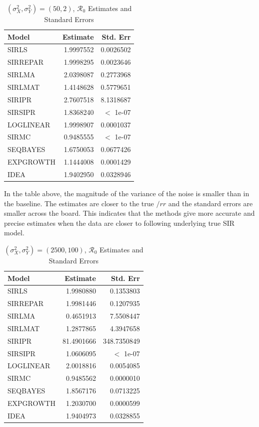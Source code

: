 \documentclass[12pt]{article}
\newcommand{\rr}{\ensuremath{\mathcal{R}_0}}
\begin{document}
\begin{table}[H]
	
	\caption{\label{tab:} $(\sigma^2_X, \sigma^2_Y) = (50, 2)$, $\rr$ Estimates and Standard Errors}
	\centering
	\begin{tabular}[t]{l|r|r}
		\hline
		Model & Estimate & Std. Err\\
		\hline
		SIRLS & 1.9997552 & 0.0026502\\
		\hline
		SIRREPAR & 1.9998295 & 0.0023646\\
		\hline
		SIRLMA & 2.0398087 & 0.2773968\\
		\hline
		SIRLMAT & 1.4148628 & 0.5779651\\
		\hline
		SIRIPR & 2.7607518 & 8.1318687\\
		\hline
		SIRSIPR & 1.8368240 & $<$ 1e-07\\
		\hline
		LOGLINEAR & 1.9998907 & 0.0001037\\
		\hline
		SIRMC & 0.9485555 & $<$ 1e-07\\
		\hline
		SEQBAYES & 1.6750053 & 0.0677426\\
		\hline
		EXPGROWTH & 1.1444008 & 0.0001429\\
		\hline
		IDEA & 1.9402950 & 0.0328946\\
		\hline
	\end{tabular}
\end{table}

In the table above, the magnitude of the variance of the noise is smaller than in the baseline. The estimates are closer to the true $/rr$ and the standard errors are smaller across the board. This indicates that the methods give more accurate and precise estimates when the data are closer to following underlying true SIR model.


\begin{table}[H]
	
	\caption{\label{tab:} $(\sigma^2_X, \sigma^2_Y) = (2500, 100)$, $\rr$ Estimates and Standard Errors}
	\centering
	\begin{tabular}[t]{l|r|r}
		\hline
		Model & Estimate & Std. Err\\
		\hline
		SIRLS & 1.9980880 & 0.1353803\\
		\hline
		SIRREPAR & 1.9981446 & 0.1207935\\
		\hline
		SIRLMA & 0.4651913 & 7.5508447\\
		\hline
		SIRLMAT & 1.2877865 & 4.3947658\\
		\hline
		SIRIPR & 81.4901666 & 348.7350849\\
		\hline
		SIRSIPR & 1.0606095 & $<$ 1e-07\\
		\hline
		LOGLINEAR & 2.0018816 & 0.0054085\\
		\hline
		SIRMC & 0.9485562 & 0.0000010\\
		\hline
		SEQBAYES & 1.8567176 & 0.0713225\\
		\hline
		EXPGROWTH & 1.2030700 & 0.0000599\\
		\hline
		IDEA & 1.9404973 & 0.0328855\\
		\hline
	\end{tabular}
\end{table}
\end{document}
